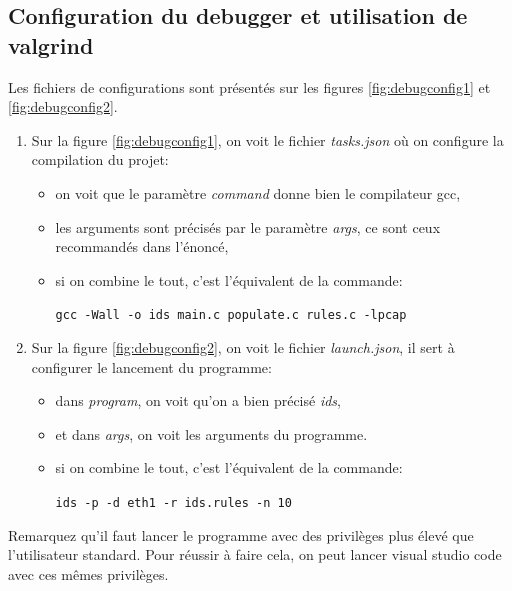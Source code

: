 \documentclass[a4paper]{article}
\begin{document}
\subsection{Configuration du debugger et utilisation de valgrind}



Les fichiers de configurations sont présentés sur les figures \ref{fig:debugconfig1} et \ref{fig:debugconfig2}.
\begin{enumerate}
    \item Sur la figure \ref{fig:debugconfig1}, on voit le fichier \textit{tasks.json} où on configure la compilation du projet:
    \begin{itemize}
        \item on voit que le paramètre \textit{command} donne bien le compilateur gcc,
        \item les arguments sont précisés par le paramètre \textit{args}, ce sont ceux recommandés dans l'énoncé,
        \item si on combine le tout, c'est l'équivalent de la commande:
        \begin{center}
            \texttt{\small gcc -Wall -o ids main.c populate.c rules.c -lpcap}
        \end{center}
    \end{itemize}
    \item Sur la figure \ref{fig:debugconfig2}, on voit le fichier \textit{launch.json}, il sert à configurer le lancement du programme:
    \begin{itemize}
        \item dans \textit{program}, on voit qu'on a bien précisé \textit{ids},
        \item et dans \textit{args}, on voit les arguments du programme.
        \item si on combine le tout, c'est l'équivalent de la commande:
        \begin{center}
            \texttt{\small ids -p -d eth1 -r ids.rules -n 10}
        \end{center}
    \end{itemize}
\end{enumerate}
Remarquez qu'il faut lancer le programme avec des privilèges plus élevé que l'utilisateur standard. Pour réussir à faire cela, on peut lancer visual studio code avec ces mêmes privilèges.
\end{document}
